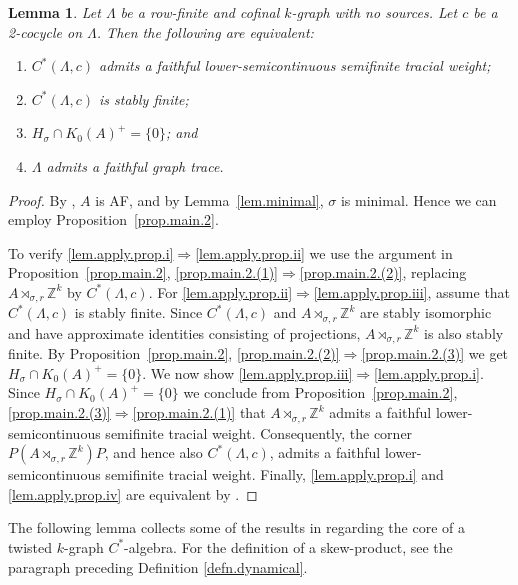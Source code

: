 \documentclass[a4paper, 12pt]{amsart}
\numberwithin{equation}{section}
\newcounter{theorem}
\newtheorem{lemma}[theorem]{Lemma}
\theoremstyle{remark}
\theoremstyle{definition}
\begin{document}
\begin{lemma}\label{lem.apply.prop}
Let $\Lambda$ be a row-finite and cofinal $k$-graph with no sources. Let $c$ be a
2-cocycle on $\Lambda$. Then the following are equivalent:
\begin{enumerate}
\item\label{lem.apply.prop.i} $C^*(\Lambda,c)$ admits a faithful lower-semicontinuous semifinite tracial
    weight;
\item\label{lem.apply.prop.ii}$C^*(\Lambda,c)$ is stably finite;
\item\label{lem.apply.prop.iii} $H_\sigma \cap K_0(A)^+ = \{0\}$; and
\item\label{lem.apply.prop.iv} $\Lambda$ admits a faithful graph trace.
\end{enumerate}
\end{lemma}
\begin{proof}
By \cite[Lemma~8.4]{MR3335414}, $A$ is AF, and by Lemma~\ref{lem.minimal}, $\sigma$ is
minimal. Hence we can employ Proposition~\ref{prop.main.2}.

To verify \eqref{lem.apply.prop.i}$\Rightarrow$\eqref{lem.apply.prop.ii} we use the argument in Proposition~\ref{prop.main.2},
\eqref{prop.main.2.(1)}$\Rightarrow$\eqref{prop.main.2.(2)}, replacing $A\rtimes_{\sigma,r} {\mathbb{Z}}^k$ by $C^*(\Lambda,c)$. For
\eqref{lem.apply.prop.ii}$\Rightarrow$\eqref{lem.apply.prop.iii}, assume that $C^*(\Lambda,c)$ is stably finite. Since $C^*(\Lambda,c)$
and ${A\rtimes_{\sigma,r} {\mathbb{Z}}^k}$ are stably isomorphic and have approximate identities consisting
of projections, $A\rtimes_{\sigma,r} {\mathbb{Z}}^k$ is also stably finite. By
Proposition~\ref{prop.main.2}, \eqref{prop.main.2.(2)}$\Rightarrow$\eqref{prop.main.2.(3)} we get $H_\sigma \cap K_0(A)^+ =
\{0\}$. We now show \eqref{lem.apply.prop.iii}$\Rightarrow$\eqref{lem.apply.prop.i}. Since $H_\sigma \cap K_0(A)^+ = \{0\}$ we
conclude from Proposition~\ref{prop.main.2}, \eqref{prop.main.2.(3)}$\Rightarrow$\eqref{prop.main.2.(1)} that $A\rtimes_{\sigma,r} {\mathbb{Z}}^k$ admits a faithful lower-semicontinuous semifinite
tracial weight. Consequently,
the corner $P(A\rtimes_{\sigma,r} {\mathbb{Z}}^k)P$, and hence also $C^*(\Lambda,c)$, admits a
faithful lower-semicontinuous semifinite tracial weight. Finally, \eqref{lem.apply.prop.i} and \eqref{lem.apply.prop.iv} are equivalent by \cite[Theorem~7.4]{MR3311883}.
\end{proof}

The following lemma collects some of the results in \cite{MR3335414} regarding the core
of a twisted $k$-graph $C^*$-algebra. For the definition of a skew-product, see the paragraph
preceding Definition \ref{defn.dynamical}.
\end{document}
